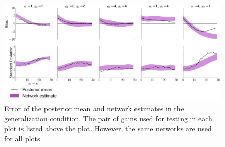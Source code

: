 \documentclass{article} %
\begin{document}
\begin{figure}[h]
\centering
\includegraphics[width = \textwidth]{High-Low_Gains.png}
\caption{Error of the posterior mean and network estimates in the generalization condition. The pair of gains used for testing in each plot is listed above the plot. However, the same networks are used for all plots.}
\end{figure}



\end{document}
